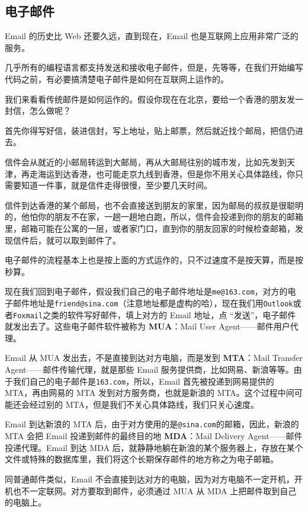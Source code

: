 \hypertarget{ux7535ux5b50ux90aeux4ef6}{%
\subsection{电子邮件}\label{ux7535ux5b50ux90aeux4ef6}}

Email 的历史比 Web 还要久远，直到现在，Email
也是互联网上应用非常广泛的服务。

几乎所有的编程语言都支持发送和接收电子邮件，但是，先等等，在我们开始编写代码之前，有必要搞清楚电子邮件是如何在互联网上运作的。

我们来看看传统邮件是如何运作的。假设你现在在北京，要给一个香港的朋友发一封信，怎么做呢？

首先你得写好信，装进信封，写上地址，贴上邮票，然后就近找个邮局，把信仍进去。

信件会从就近的小邮局转运到大邮局，再从大邮局往别的城市发，比如先发到天津，再走海运到达香港，也可能走京九线到香港，但是你不用关心具体路线，你只需要知道一件事，就是信件走得很慢，至少要几天时间。

信件到达香港的某个邮局，也不会直接送到朋友的家里，因为邮局的叔叔是很聪明的，他怕你的朋友不在家，一趟一趟地白跑，所以，信件会投递到你的朋友的邮箱里，邮箱可能在公寓的一层，或者家门口，直到你的朋友回家的时候检查邮箱，发现信件后，就可以取到邮件了。

电子邮件的流程基本上也是按上面的方式运作的，只不过速度不是按天算，而是按秒算。

现在我们回到电子邮件，假设我们自己的电子邮件地址是\texttt{me@163.com}，对方的电子邮件地址是\texttt{friend@sina.com}（注意地址都是虚构的哈），现在我们用\texttt{Outlook}或者\texttt{Foxmail}之类的软件写好邮件，填上对方的
Email 地址，点 ``发送''，电子邮件就发出去了。这些电子邮件软件被称为
\textbf{MUA}：Mail User Agent------邮件用户代理。

Email 从 MUA 发出去，不是直接到达对方电脑，而是发到 \textbf{MTA}：Mail
Transfer Agent------邮件传输代理，就是那些 Email
服务提供商，比如网易、新浪等等。由于我们自己的电子邮件是\texttt{163.com}，所以，Email
首先被投递到网易提供的 MTA，再由网易的 MTA 发到对方服务商，也就是新浪的
MTA。这个过程中间可能还会经过别的
MTA，但是我们不关心具体路线，我们只关心速度。

Email 到达新浪的 MTA
后，由于对方使用的是\texttt{@sina.com}的邮箱，因此，新浪的 MTA 会把
Email 投递到邮件的最终目的地 \textbf{MDA}：Mail Delivery
Agent------邮件投递代理。Email 到达 MDA
后，就静静地躺在新浪的某个服务器上，存放在某个文件或特殊的数据库里，我们将这个长期保存邮件的地方称之为电子邮箱。

同普通邮件类似，Email
不会直接到达对方的电脑，因为对方电脑不一定开机，开机也不一定联网。对方要取到邮件，必须通过
MUA 从 MDA 上把邮件取到自己的电脑上。

